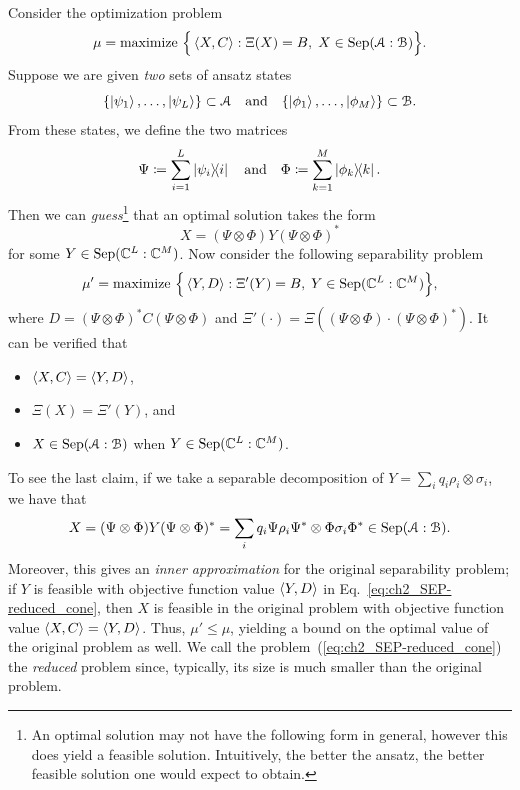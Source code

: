 Consider the optimization problem  
\begin{equation}
    \mu = \text{maximize } \Big\{ \left\langle X, C \right\rangle : \Xi(X) = B, \; X \in \mathrm{Sep}(\mathcal{A} : \mathcal{B}) \Big\}.  
\end{equation} 
Suppose we are given \emph{two} sets of ansatz states $$\{\ket{\psi_1}, \dots, \ket{\psi_L}\} \subset \mathcal{A} \quad \text{and} \quad \{\ket{\phi_1}, \dots, \ket{\phi_M}\} \subset \mathcal{B}.$$ 
From these states, we define the two matrices 
\begin{equation}
    \Psi \coloneqq \sum_{i=1}^L \ketbra{\psi_i}{i} \quad \text{and} \quad \Phi \coloneqq \sum_{k=1}^M \ketbra{\phi_k}{k}.
\end{equation} 
Then we can \emph{guess}\footnote{An optimal solution may not have the following form in general, however this does yield a feasible solution. 
Intuitively, the better the ansatz, the better feasible solution one would expect to obtain.} that an optimal solution takes the form 
\begin{equation} 
X = (\Psi \otimes \Phi) Y (\Psi \otimes \Phi)^* 
\end{equation} 
for some $Y \in \mathrm{Sep}(\mathbb{C}^L : \mathbb{C}^M)$.   
Now consider the following separability problem 
\begin{equation}
    \label{eq:ch2_SEP-reduced_cone}
    \begin{aligned}
        \mu' = \text{maximize } \Big\{ \left\langle Y, D \right\rangle : \Xi'(Y) = B, \; Y \in \mathrm{Sep}(\mathbb{C}^L : \mathbb{C}^M) \Big\}, 
    \end{aligned}
\end{equation}
where 
$D = (\Psi \otimes \Phi)^* C (\Psi \otimes \Phi)$ 
and 
$\Xi'(\cdot) = \Xi((\Psi \otimes \Phi) \cdot (\Psi \otimes \Phi)^*)$.   
It can be verified that 
\begin{itemize} 
\item $\left\langle X, C \right\rangle = \left\langle Y, D \right\rangle$, 
\item $\Xi(X) = \Xi'(Y)$, and 
\item $X \in \mathrm{Sep}(\mathcal{A} : \mathcal{B})$ when $Y \in \mathrm{Sep}(\mathbb{C}^L : \mathbb{C}^M)$.  
\end{itemize}  
To see the last claim, if we take a separable decomposition of $Y = \sum_i q_i \rho_i \otimes \sigma_i$, we have that 
\begin{equation} 
X 
= (\Psi \otimes \Phi) Y (\Psi \otimes \Phi)^* 
= \sum_i q_i \Psi \rho_i \Psi^* \otimes \Phi \sigma_i \Phi^* \in \mathrm{Sep}(\mathcal{A} : \mathcal{B}). 
\end{equation} 
Moreover, this gives an \emph{inner approximation} for the original separability problem; if $Y$ is feasible with objective function value $\left\langle Y, D \right\rangle$ in Eq.~\eqref{eq:ch2_SEP-reduced_cone}, then $X$ is feasible in the original problem with objective function value $\left\langle X, C \right\rangle = \left\langle Y, D \right\rangle$. 
Thus, $\mu' \leq \mu$, yielding a bound on the optimal value of the original problem as well. 
We call the problem~(\ref{eq:ch2_SEP-reduced_cone}) the \emph{reduced} problem since, typically, its size is much smaller than the original problem. 

